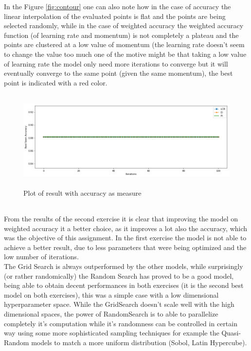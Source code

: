 \documentclass[12pt, onecolumn]{article}
\begin{document}
In the Figure \ref{fig:contour} one can also note how in the case of accuracy the linear interpolation of the evaluated points is flat and the points are being selected randomly, while in the case of weighted accuracy the weighted accuracy function (of learning rate and momentum) is not completely a plateau and the points are clustered at a low value of momentum (the learning rate doesn't seem to change the value too much one of the motive might be that taking a low value of learning rate the model only need more iterations to converge but it will eventually converge to the same point (given the same momentum), the best point is indicated with a red color.  
\begin{figure}[!h]
  \centering
  \includegraphics[width=\linewidth, height=5cm]{imgs/second_comparision_accuracy.png}
  \caption{Plot of result with accuracy as measure}
  \label{fig:second_acc}
\end{figure}\\
From the results of the second exercise it is clear that improving the model on weighted accuracy it a better choice, as it improves a lot also the accuracy, which was the objective of this assignment.
In the first exercise the model is not able to achieve a better result, due to less parameters that were being optimized and the low number of iterations.\\
The Grid Search is always outperformed by the other models, while surprisingly (or rather randomically) the Random Search has proved to be a good model, being able to obtain decent performances in both exercises (it is the second best model on both exercises), this was a simple case with a low dimensional hyperparameter space.
While the GridSearch doesn't scale well with the high dimensional spaces, the power of RandomSearch is to able to parallelize completely it's computation while it's randomness can be controlled in certain way using some more sophisticated sampling techniques for example the Quasi-Random models to match a more uniform distribution (Sobol, Latin Hypercube).
\end{document}
